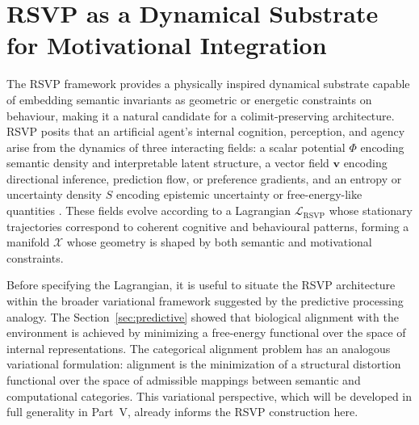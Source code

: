 \documentclass[12pt]{article}
\theoremstyle{definition}
\begin{document}
\section{RSVP as a Dynamical Substrate for Motivational Integration}

The RSVP framework provides a physically inspired dynamical substrate capable of
embedding semantic invariants as geometric or energetic constraints on behaviour,
making it a natural candidate for a colimit-preserving architecture. RSVP posits
that an artificial agent's internal cognition, perception, and agency arise from
the dynamics of three interacting fields: a scalar potential $\Phi$ encoding
semantic density and interpretable latent structure, a vector field $\mathbf{v}$
encoding directional inference, prediction flow, or preference gradients, and an
entropy or uncertainty density $S$ encoding epistemic uncertainty or
free-energy-like quantities \citep{friston2010}. These fields evolve according
to a Lagrangian $\mathcal{L}_{\mathrm{RSVP}}$ whose stationary trajectories
correspond to coherent cognitive and behavioural patterns, forming a manifold
$\mathcal{X}$ whose geometry is shaped by both semantic and motivational
constraints.

Before specifying the Lagrangian, it is useful to situate the RSVP architecture
within the broader variational framework suggested by the predictive processing
analogy. The Section~\ref{sec:predictive} showed that biological alignment with
the environment is achieved by minimizing a free-energy functional over the
space of internal representations. The categorical alignment problem has an
analogous variational formulation: alignment is the minimization of a structural
distortion functional over the space of admissible mappings between semantic and
computational categories. This variational perspective, which will be developed
in full generality in Part~V, already informs the RSVP construction here.
\end{document}
